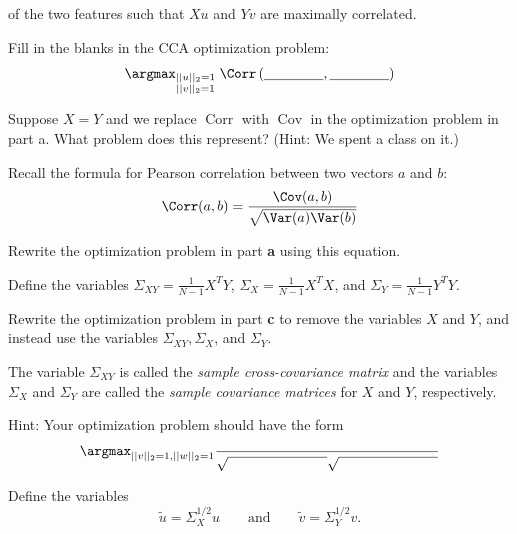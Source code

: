 \documentclass[12pt]{article}
\begin{document}
of the two features such that $Xu$ and $Yv$ are maximally correlated.

\begin{subquestions}
\item Fill in the blanks in the CCA optimization problem:
\begin{equation}
    \argmax_{\substack{||u||_2=1 \\ ||v||_2=1}} \;\Corr\left(\underline{\hspace{1.5cm}},\underline{\hspace{1.5cm}} \right)
\end{equation}

\item Suppose $X=Y$ and we replace $\operatorname{Corr}$ with $\operatorname{Cov}$ in the optimization problem in part a. What problem does this represent? (Hint: We spent a class on it.)

\item Recall the formula for Pearson correlation between two vectors $a$ and $b$:
\begin{equation}
    \Corr(a,b) = \frac{\Cov(a,b)}{\sqrt{\Var(a) \Var(b)}}
\end{equation}

Rewrite the optimization problem in part \textbf{a} using this equation.

\item Define the variables $\Sigma_{XY}=\frac{1}{N-1}X^{T}Y$, $\Sigma_X=\frac{1}{N-1}X^{T}X$, and $\Sigma_Y=\frac{1}{N-1}Y^{T}Y$.

Rewrite the optimization problem in part \textbf{c} to remove the variables $X$ and $Y$, and instead use the variables $\Sigma_{XY}, \Sigma_X$, and $\Sigma_Y$.

The variable $\Sigma_{XY}$ is called the \emph{sample cross-covariance matrix} and the variables $\Sigma_X$ and $\Sigma_Y$ are called the \emph{sample covariance matrices} for $X$ and $Y$, respectively.

Hint: Your optimization problem should have the form
\begin{equation}
    \argmax_{\substack{||v||_2=1, ||w||_2=1}} \frac{}{\sqrt{\hspace{2.5cm}}
 \sqrt{\hspace{2.5cm}}}
\end{equation}

\item Define the variables
\begin{equation}
    \widetilde{u}=\Sigma_X^{1/2}u
\qquad\text{and}\qquad
\widetilde{v}=\Sigma_Y^{1/2}v.
\end{equation}


\end{subquestions}
\end{document}
